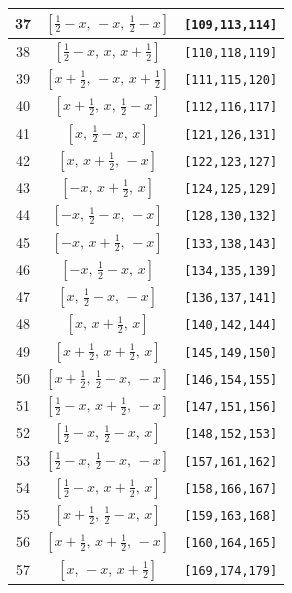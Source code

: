 \documentclass[fleqn,8pt]{jsarticle}
\begin{document}
\begin{longtable}{ccc}
37 & $\left[ \frac{1}{2} - x,\, - x,\, \frac{1}{2} - x \right]$ & {\tt [109,113,114]} \\ \hline
38 & $\left[ \frac{1}{2} - x,\, x,\, x + \frac{1}{2} \right]$ & {\tt [110,118,119]} \\ \hline
39 & $\left[ x + \frac{1}{2},\, - x,\, x + \frac{1}{2} \right]$ & {\tt [111,115,120]} \\ \hline
40 & $\left[ x + \frac{1}{2},\, x,\, \frac{1}{2} - x \right]$ & {\tt [112,116,117]} \\ \hline
41 & $\left[ x,\, \frac{1}{2} - x,\, x \right]$ & {\tt [121,126,131]} \\ \hline
42 & $\left[ x,\, x + \frac{1}{2},\, - x \right]$ & {\tt [122,123,127]} \\ \hline
43 & $\left[ - x,\, x + \frac{1}{2},\, x \right]$ & {\tt [124,125,129]} \\ \hline
44 & $\left[ - x,\, \frac{1}{2} - x,\, - x \right]$ & {\tt [128,130,132]} \\ \hline
45 & $\left[ - x,\, x + \frac{1}{2},\, - x \right]$ & {\tt [133,138,143]} \\ \hline
46 & $\left[ - x,\, \frac{1}{2} - x,\, x \right]$ & {\tt [134,135,139]} \\ \hline
47 & $\left[ x,\, \frac{1}{2} - x,\, - x \right]$ & {\tt [136,137,141]} \\ \hline
48 & $\left[ x,\, x + \frac{1}{2},\, x \right]$ & {\tt [140,142,144]} \\ \hline
49 & $\left[ x + \frac{1}{2},\, x + \frac{1}{2},\, x \right]$ & {\tt [145,149,150]} \\ \hline
50 & $\left[ x + \frac{1}{2},\, \frac{1}{2} - x,\, - x \right]$ & {\tt [146,154,155]} \\ \hline
51 & $\left[ \frac{1}{2} - x,\, x + \frac{1}{2},\, - x \right]$ & {\tt [147,151,156]} \\ \hline
52 & $\left[ \frac{1}{2} - x,\, \frac{1}{2} - x,\, x \right]$ & {\tt [148,152,153]} \\ \hline
53 & $\left[ \frac{1}{2} - x,\, \frac{1}{2} - x,\, - x \right]$ & {\tt [157,161,162]} \\ \hline
54 & $\left[ \frac{1}{2} - x,\, x + \frac{1}{2},\, x \right]$ & {\tt [158,166,167]} \\ \hline
55 & $\left[ x + \frac{1}{2},\, \frac{1}{2} - x,\, x \right]$ & {\tt [159,163,168]} \\ \hline
56 & $\left[ x + \frac{1}{2},\, x + \frac{1}{2},\, - x \right]$ & {\tt [160,164,165]} \\ \hline
57 & $\left[ x,\, - x,\, x + \frac{1}{2} \right]$ & {\tt [169,174,179]} \\ \hline

\end{longtable}
\end{document}
